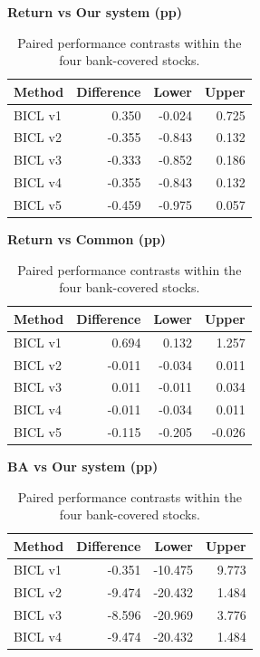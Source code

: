 \begin{table}[htb]
\centering\small
\setlength{\tabcolsep}{3pt}
\renewcommand{\arraystretch}{1.12}
\caption{Paired performance contrasts within the four bank-covered stocks.}
\label{tab:u09-sensitivity-core4}
\begin{minipage}[t]{0.48\textwidth}
\centering
\textbf{Return vs Our system (pp)}\par\smallskip
\begin{tabular}{lrrr}
\hline
Method & Difference & Lower & Upper \\
\hline
BICL v1 & 0.350 & -0.024 & 0.725 \\
BICL v2 & -0.355 & -0.843 & 0.132 \\
BICL v3 & -0.333 & -0.852 & 0.186 \\
BICL v4 & -0.355 & -0.843 & 0.132 \\
BICL v5 & -0.459 & -0.975 & 0.057 \\
\hline
\end{tabular}
\end{minipage}\hfill
\begin{minipage}[t]{0.48\textwidth}
\centering
\textbf{Return vs Common (pp)}\par\smallskip
\begin{tabular}{lrrr}
\hline
Method & Difference & Lower & Upper \\
\hline
BICL v1 & 0.694 & 0.132 & 1.257 \\
BICL v2 & -0.011 & -0.034 & 0.011 \\
BICL v3 & 0.011 & -0.011 & 0.034 \\
BICL v4 & -0.011 & -0.034 & 0.011 \\
BICL v5 & -0.115 & -0.205 & -0.026 \\
\hline
\end{tabular}
\end{minipage}\par\medskip
\begin{minipage}[t]{0.48\textwidth}
\centering
\textbf{BA vs Our system (pp)}\par\smallskip
\begin{tabular}{lrrr}
\hline
Method & Difference & Lower & Upper \\
\hline
BICL v1 & -0.351 & -10.475 & 9.773 \\
BICL v2 & -9.474 & -20.432 & 1.484 \\
BICL v3 & -8.596 & -20.969 & 3.776 \\
BICL v4 & -9.474 & -20.432 & 1.484 \\

\end{tabular}
\end{minipage}
\end{table}

